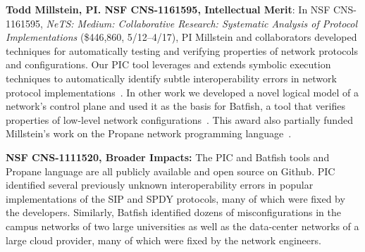 \medskip
\noindent
{\bf Todd Millstein, PI. NSF CNS-1161595, Intellectual Merit}: In NSF CNS-1161595, {\em NeTS: Medium: Collaborative Research: Systematic Analysis of Protocol Implementations} (\$446,860, 5/12--4/17), PI Millstein and collaborators developed techniques for automatically testing and verifying properties of network protocols and configurations.  Our PIC tool leverages and extends symbolic execution techniques to automatically identify subtle interoperability errors in network protocol implementations~\cite{DBLP:conf/nsdi/PedrosaFKGMM15}.  In other work we developed a novel logical model of a network's control plane and used it as the basis for Batfish, a tool that verifies properties of low-level network configurations~\cite{batfish}.  This award also partially funded Millstein's work on the Propane network programming language~\cite{propane}. 

\noindent
{\bf NSF CNS-1111520, Broader Impacts:} The PIC and Batfish tools and Propane language are all publicly available and open source on Github.  PIC identified several previously unknown interoperability errors in popular implementations of the SIP and SPDY protocols, many of which were fixed by the developers.  Similarly, Batfish identified dozens of misconfigurations in the campus networks of two large universities as well as the data-center networks of a large cloud provider, many of which were fixed by the network engineers.

